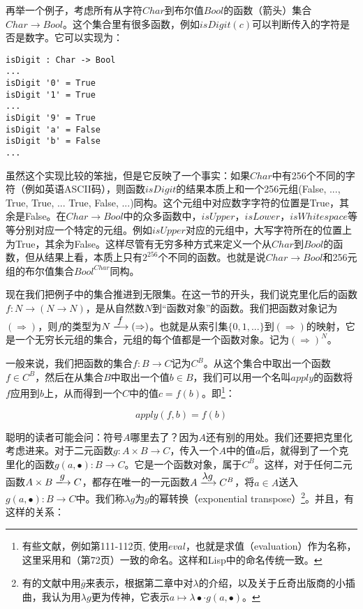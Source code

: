 \documentclass{article}
\begin{document}
\begin{example}
再举一个例子，考虑所有从字符$Char$到布尔值$Bool$的函数（箭头）集合$Char \to Bool$。这个集合里有很多函数，例如$isDigit(c)$可以判断传入的字符是否是数字。它可以实现为：

\lstset{frame=none}
\begin{lstlisting}[style=Haskell]
isDigit : Char -> Bool
...
isDigit '0' = True
isDigit '1' = True
...
isDigit '9' = True
isDigit 'a' = False
isDigit 'b' = False
...
\end{lstlisting}

虽然这个实现比较的笨拙，但是它反映了一个事实：如果$Char$中有256个不同的字符（例如英语ASCII码），则函数$isDigit$的结果本质上和一个256元组(False, ..., True, True, ... True, False, ...)同构。这个元组中对应数字字符的位置是True，其余是False。在$Char \to Bool$中的众多函数中，$isUpper$，$isLower$，$isWhitespace$等等分别对应一个特定的元组。例如$isUpper$对应的元组中，大写字符所在的位置上为True，其余为False。这样尽管有无穷多种方式来定义一个从$Char$到$Bool$的函数，但从结果上看，本质上只有$2^{256}$个不同的函数。也就是说$Char \to Bool$和256元组的布尔值集合$Bool^{Char}$同构。
\end{example}

现在我们把例子中的集合推进到无限集。在这一节的开头，我们说克里化后的函数$f: N \to (N \to N)$，是从自然数$N$到“函数对象”的函数。我们把函数对象记为$(\Rightarrow)$，则$f$的类型为$N \arrowto{f} (\Rightarrow)$。也就是从索引集$\{0, 1, ...\}$到$(\Rightarrow)$的映射，它是一个无穷长元组的集合，元组的每个值都是一个函数对象。记为$(\Rightarrow)^N$。

一般来说，我们把函数的集合$f : B \to C$记为$C^B$。从这个集合中取出一个函数$f \in C^B$，然后在从集合$B$中取出一个值$b \in B$，我们可以用一个名叫$apply$的函数将$f$应用到$b$上，从而得到一个$C$中的值$c = f(b)$。即\footnote{有些文献，例如\cite{PeterSmith2018}第111-112页, \cite{Wiki-Exponentials}使用$eval$，也就是求值（evaluation）作为名称，这里采用和\cite{Bird97}（第72页）一致的命名。这样和Lisp中的命名传统一致。}：

\[
apply(f, b) = f(b)
\]

聪明的读者可能会问：符号$A$哪里去了？因为$A$还有别的用处。我们还要把克里化考虑进来。对于二元函数$g: A \times B \to C$，传入一个$A$中的值$a$后，就得到了一个克里化的函数$g(a, \bullet) : B \to C$。它是一个函数对象，属于$C^B$。这样，对于任何二元函数$A \times B \arrowto{g} C$，都存在唯一的一元函数$A \arrowto{\lambda g} C^B$，将$a \in A$送入$g(a, \bullet) : B \to C$中。我们称$\lambda g$为$g$的幂转换（exponential transpose）\footnote{有的文献中用$\bar{g}$来表示，根据第二章中对$\lambda$的介绍，以及关于丘奇出版商的小插曲，我认为用$\lambda g$更为传神，它表示$a \mapsto \lambda \bullet \cdot g(a, \bullet)$。}。并且，有这样的关系：
\end{document}
